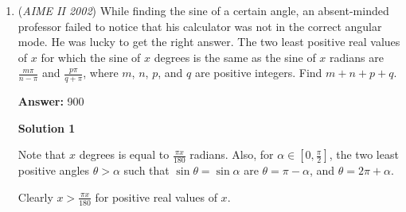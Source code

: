 \begin{enumerate}
 



\textbf{Solution 2.1}

Continue until $\sum_{k=1}^{10} \binom{10}{k} \cdot (2^{k-1} -1)$. is obtained. Then,

 
 \[\sum_{k=1}^{10} \binom{10}{k} \cdot 2^{k-1} - \binom{10}{k}\]
 \[\sum_{k=1}^{10} \binom{10}{k} \cdot 2^{k-1} - \sum_{k=1}^{10} \binom{10}{k}\]

 Subset Theorem on the right sum,

 
 \[\sum_{k=1}^{10} \binom{10}{k} \cdot 2^{k-1} - (2^{10} - 1)\]

 Left sum rearrangement,

 
 \[(\frac{1}{2} \cdot \sum_{k=1}^{10} \binom{10}{k} \cdot 2^{k}) - (2^{10} - 1)\]

 Binomial Theorem

 
 \[\frac{1}{2} \cdot (1+2)^{10} - 1 = 3^{10} - 1\]

 So 

 
 \[\frac{1}{2} \cdot (3^{10}-1) - 2^{10} + 1 \pmod{1000}\]

 is desired. Note that $\frac{1}{2} \cdot (3^{10} - 1)  \pmod{1000}$ is the same as $524$ so we have $524 - 2^{10} + 1 \pmod{1000}$  or $500+1 \pmod{1000}$ or $\boxed{501}$.

 Overall this is much simpler than computing the behemoth above.

 


	\item (\textit{AIME II 2002}) While finding the sine of a certain angle, an absent-minded professor failed to notice that his calculator was not in the correct angular mode. He was lucky to get the right answer. The two least positive real values of $x$ for which the sine of $x$ degrees is the same as the sine of $x$ radians are $\frac{m\pi}{n-\pi}$ and $\frac{p\pi}{q+\pi}$, where $m$, $n$, $p$, and $q$ are positive integers. Find $m+n+p+q$.


 
 \textbf{Answer: }900



\textbf{Solution 1}

Note that $x$ degrees is equal to $\frac{\pi x}{180}$ radians. Also, for $\alpha \in \left[0 , \frac{\pi}{2} \right]$, the two least positive angles $\theta > \alpha$ such that $\sin{\theta} = \sin{\alpha}$ are $\theta = \pi-\alpha$, and $\theta = 2\pi + \alpha$. 

 Clearly $x > \frac{\pi x}{180}$ for positive real values of $x$. 


\end{enumerate}
